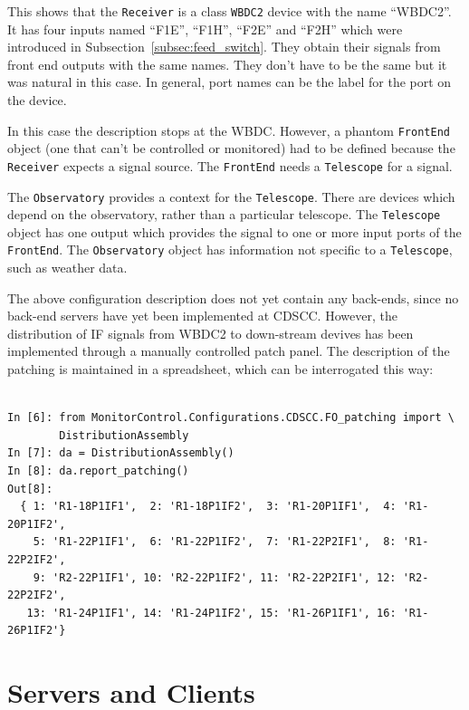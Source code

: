 \documentclass[letterpaper,11pt]{book}
\begin{document}
This shows that the {\tt Receiver} is a class {\tt WBDC2} device with the name
``WBDC2''.  It has four inputs named ``F1E'', ``F1H'', ``F2E'' and
``F2H'' which were introduced in Subsection~\ref{subsec:feed_switch}. They
obtain their signals from front end outputs with the same names.  They
don't have to be the same but it was natural in this case.  In general, port
names can be the label for the port on the device.

In this case the description stops at the WBDC.  However, a phantom 
{\tt FrontEnd} object (one that can't be controlled or monitored) had to be 
defined because the {\tt Receiver} expects a signal source.  The 
{\tt FrontEnd} needs a {\tt Telescope} for a signal.

The {\tt Observatory} provides a context for the {\tt Telescope}.  There are
devices which depend on the observatory, rather than a particular telescope.
The {\tt Telescope} object has one output which provides the signal to one or
more input ports of the {\tt FrontEnd}.  The {\tt Observatory} object has
information not specific to a {\tt Telescope}, such as weather data.

The above configuration description does not yet contain any back-ends, since
no back-end servers have yet been implemented at CDSCC.  However, the
distribution of IF signals from WBDC2 to down-stream devives has been
implemented through a manually controlled patch panel.  The description of the
patching is maintained in a spreadsheet, which can be interrogated this way:
\begin{code}[h!tb]
  \begin{center}
  \begin{verbatim}
  
In [6]: from MonitorControl.Configurations.CDSCC.FO_patching import \
        DistributionAssembly
In [7]: da = DistributionAssembly()
In [8]: da.report_patching()
Out[8]:
  { 1: 'R1-18P1IF1',  2: 'R1-18P1IF2',  3: 'R1-20P1IF1',  4: 'R1-20P1IF2',
    5: 'R1-22P1IF1',  6: 'R1-22P1IF2',  7: 'R1-22P2IF1',  8: 'R1-22P2IF2',
    9: 'R2-22P1IF1', 10: 'R2-22P1IF2', 11: 'R2-22P2IF1', 12: 'R2-22P2IF2',
   13: 'R1-24P1IF1', 14: 'R1-24P1IF2', 15: 'R1-26P1IF1', 16: 'R1-26P1IF2'}
\end{verbatim}
\end{center}
\end{code}

\chapter{Servers and Clients}\label{chap:servers}
\end{document}
